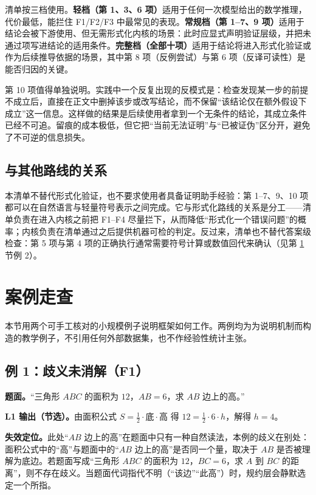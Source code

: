 清单按三档使用。\textbf{轻档（第 1、3、6 项）}适用于任何一次模型给出的数学推理，代价最低，能拦住 F1/F2/F3 中最常见的表现。\textbf{常规档（第 1--7、9 项）}适用于结论会被下游使用、但无需形式化内核的场景：此时应显式声明验证层级，并把未通过项写进结论的适用条件。\textbf{完整档（全部十项）}适用于结论将进入形式化验证或作为后续推导依据的场景，其中第 8 项（反例尝试）与第 6 项（反译可读性）是能否归因的关键。

第 10 项值得单独说明。实践中一个反复出现的反模式是：检查发现某一步的前提不成立后，直接在正文中删掉该步或改写结论，而不保留“该结论仅在额外假设下成立”这一信息。这样做的结果是后续使用者拿到一个无条件的结论，其成立条件已经不可追。留痕的成本极低，但它把“当前无法证明”与“已被证伪”区分开，避免了不可逆的信息损失。

\subsection{与其他路线的关系}

本清单不替代形式化验证，也不要求使用者具备证明助手经验：第 1--7、9、10 项都可以在自然语言与轻量符号表示之间完成。它与形式化路线的关系是分工——清单负责在进入内核之前把 F1--F4 尽量拦下，从而降低“形式化一个错误问题”的概率；内核负责在清单通过之后提供机器可检的判定。反过来，清单也不替代答案级检查：第 5 项与第 4 项的正确执行通常需要符号计算或数值回代来确认（见第 \ref{sec:case} 节例 2）。

\section{案例走查}\label{sec:case}

本节用两个可手工核对的小规模例子说明框架如何工作。两例均为为说明机制而构造的教学例子，不引用任何外部数据集，也不作经验性统计主张。

\subsection{例 1：歧义未消解（F1）}

\textbf{题面。}“三角形 $ABC$ 的面积为 $12$，$AB = 6$，求 $AB$ 边上的高。”

\textbf{L1 输出（节选）。}由面积公式 $S = \frac{1}{2}\cdot \text{底} \cdot \text{高}$ 得 $12 = \frac{1}{2}\cdot 6 \cdot h$，解得 $h = 4$。

\textbf{失效定位。}此处“$AB$ 边上的高”在题面中只有一种自然读法，本例的歧义在别处：面积公式中的“高”与题面中的“$AB$ 边上的高”是否同一个量，取决于 $AB$ 是否被理解为底边。若题面写成“三角形 $ABC$ 的面积为 $12$，$BC = 6$，求 $A$ 到 $BC$ 的距离”，则不存在歧义。当题面代词指代不明（“该边”“此高”）时，规约层会静默选定一个所指。

